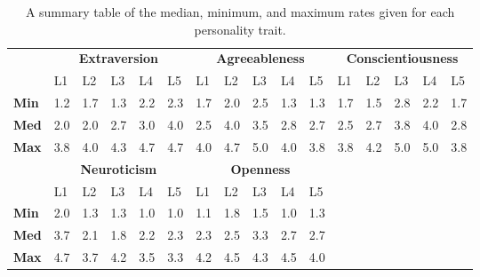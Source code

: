\begin{table}[hbt!]
    \renewcommand{\arraystretch}{1}
    \begin{center}
        \begin{tabular}{p{}|
        p{}|p{}|p{}|p{}|p{}||
        p{}|p{}|p{}|p{}|p{}||
        p{}|p{}|p{}|p{}|p{}|}
            \cline{2-16}
            & \multicolumn{5}{c||}{\textbf{Extraversion}} & \multicolumn{5}{c||}{\textbf{Agreeableness}}
            & \multicolumn{5}{c|}{\textbf{Conscientiousness}} \\
            \cline{2-16}
            & L1 & L2 & L3 & L4 & L5 & L1 & L2 & L3 & L4 & L5 & L1 & L2 & L3 & L4 & L5      \\
            \cline{2-16}
            \textbf{Min}    & 1.2 & 1.7 & 1.3 & 2.2 & 2.3 & 1.7 & 2.0 & 2.5 & 1.3 & 1.3 & 1.7 & 1.5 & 2.8 & 2.2 & 1.7  \\
            \textbf{Med}    & 2.0 & 2.0 & 2.7 & 3.0 & 4.0 & 2.5 & 4.0 & 3.5 & 2.8 & 2.7 & 2.5 & 2.7 & 3.8 & 4.0 & 2.8  \\
            \textbf{Max}    & 3.8 & 4.0 & 4.3 & 4.7 & 4.7 & 4.0 & 4.7 & 5.0 & 4.0 & 3.8 & 3.8 & 4.2 & 5.0 & 5.0 & 3.8 \\
            \cline{2-16}
            \cline{2-11}
            &  \multicolumn{5}{|c||}{\textbf{Neuroticism}} & \multicolumn{5}{|c||}{\textbf{Openness}} \\
            \cline{2-11}
            & L1 & L2 & L3 & L4 & L5 & L1 & L2 & L3 & L4 & L5            \\
            \cline{2-11}
            \textbf{Min}    & 2.0 & 1.3 & 1.3 & 1.0 & 1.0 & 1.1 & 1.8 & 1.5 & 1.0 & 1.3    \\
            \textbf{Med}    & 3.7 & 2.1 & 1.8 & 2.2 & 2.3 & 2.3 & 2.5 & 3.3 & 2.7 & 2.7    \\
            \textbf{Max}    & 4.7 & 3.7 & 4.2 & 3.5 & 3.3 & 4.2 & 4.5 & 4.3 & 4.5 & 4.0    \\
            \cline{2-11}
        \end{tabular}
        \caption{A summary table of the median, minimum, and maximum rates given for each personality trait.}
        \label{table:medianMM1}
    \end{center}
\end{table}

